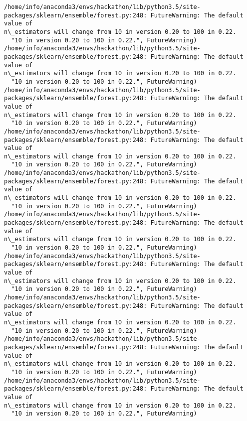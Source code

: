 \documentclass[11pt]{article}
\begin{document}
    \begin{Verbatim}[commandchars=\\\{\}]
/home/info/anaconda3/envs/hackathon/lib/python3.5/site-
packages/sklearn/ensemble/forest.py:248: FutureWarning: The default value of
n\_estimators will change from 10 in version 0.20 to 100 in 0.22.
  "10 in version 0.20 to 100 in 0.22.", FutureWarning)
/home/info/anaconda3/envs/hackathon/lib/python3.5/site-
packages/sklearn/ensemble/forest.py:248: FutureWarning: The default value of
n\_estimators will change from 10 in version 0.20 to 100 in 0.22.
  "10 in version 0.20 to 100 in 0.22.", FutureWarning)
/home/info/anaconda3/envs/hackathon/lib/python3.5/site-
packages/sklearn/ensemble/forest.py:248: FutureWarning: The default value of
n\_estimators will change from 10 in version 0.20 to 100 in 0.22.
  "10 in version 0.20 to 100 in 0.22.", FutureWarning)
/home/info/anaconda3/envs/hackathon/lib/python3.5/site-
packages/sklearn/ensemble/forest.py:248: FutureWarning: The default value of
n\_estimators will change from 10 in version 0.20 to 100 in 0.22.
  "10 in version 0.20 to 100 in 0.22.", FutureWarning)
/home/info/anaconda3/envs/hackathon/lib/python3.5/site-
packages/sklearn/ensemble/forest.py:248: FutureWarning: The default value of
n\_estimators will change from 10 in version 0.20 to 100 in 0.22.
  "10 in version 0.20 to 100 in 0.22.", FutureWarning)
/home/info/anaconda3/envs/hackathon/lib/python3.5/site-
packages/sklearn/ensemble/forest.py:248: FutureWarning: The default value of
n\_estimators will change from 10 in version 0.20 to 100 in 0.22.
  "10 in version 0.20 to 100 in 0.22.", FutureWarning)
/home/info/anaconda3/envs/hackathon/lib/python3.5/site-
packages/sklearn/ensemble/forest.py:248: FutureWarning: The default value of
n\_estimators will change from 10 in version 0.20 to 100 in 0.22.
  "10 in version 0.20 to 100 in 0.22.", FutureWarning)
/home/info/anaconda3/envs/hackathon/lib/python3.5/site-
packages/sklearn/ensemble/forest.py:248: FutureWarning: The default value of
n\_estimators will change from 10 in version 0.20 to 100 in 0.22.
  "10 in version 0.20 to 100 in 0.22.", FutureWarning)
/home/info/anaconda3/envs/hackathon/lib/python3.5/site-
packages/sklearn/ensemble/forest.py:248: FutureWarning: The default value of
n\_estimators will change from 10 in version 0.20 to 100 in 0.22.
  "10 in version 0.20 to 100 in 0.22.", FutureWarning)
/home/info/anaconda3/envs/hackathon/lib/python3.5/site-
packages/sklearn/ensemble/forest.py:248: FutureWarning: The default value of
n\_estimators will change from 10 in version 0.20 to 100 in 0.22.
  "10 in version 0.20 to 100 in 0.22.", FutureWarning)
\end{Verbatim}
\end{document}
